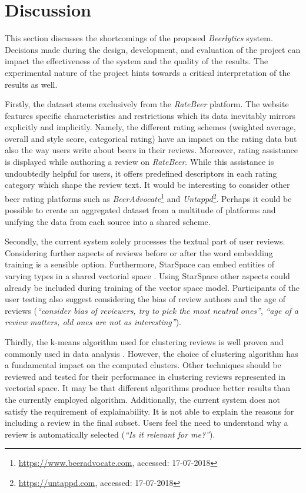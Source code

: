 \section{Discussion} \label{sec:discussion}
This section discusses the shortcomings of the proposed \textit{Beerlytics} system.
Decisions made during the design, development, and evaluation of the project can impact the effectiveness of the system and the quality of the results.
The experimental nature of the project hints towards a critical interpretation of the results as well.

Firstly, the dataset stems exclusively from the \textit{RateBeer} platform.
The website features specific characteristics and restrictions which its data inevitably mirrors explicitly and implicitly.
Namely, the different rating schemes (weighted average, overall and style score, categorical rating) have an impact on the rating data but also the way users write about beers in their reviews.
Moreover, rating assistance is displayed while authoring a review on \textit{RateBeer}.
While this assistance is undoubtedly helpful for users, it offers predefined descriptors in each rating category which shape the review text.
It would be interesting to consider other beer rating platforms such as \textit{BeerAdvocate}\footnote{\url{https://www.beeradvocate.com}, accessed: 17-07-2018} and \textit{Untappd}\footnote{\url{https://untappd.com}, accessed: 17-07-2018}.
Perhaps it could be possible to create an aggregated dataset from a multitude of platforms and unifying the data from each source into a shared scheme.

Secondly, the current system solely processes the textual part of user reviews.
Considering further aspects of reviews before or after the word embedding training is a sensible option.
Furthermore, StarSpace can embed entities of varying types in a shared vectorial space \cite{Wu2017}.
Using StarSpace other aspects could already be included during training of the vector space model.
Participants of the user testing also suggest considering the bias of review authors and the age of reviews (\emph{``consider bias of reviewers, try to pick the most neutral ones''}, \emph{``age of a review matters, old ones are not as interesting''}).

Thirdly, the k-means algorithm used for clustering reviews is well proven and commonly used in data analysis \cite{Manning2009}.
However, the choice of clustering algorithm has a fundamental impact on the computed clusters.
Other techniques should be reviewed and tested for their performance in clustering reviews represented in vectorial space.
It may be that different algorithms produce better results than the currently employed algorithm.
Additionally, the current system does not satisfy the requirement of explainability.
It is not able to explain the reasons for including a review in the final subset.
Users feel the need to understand why a review is automatically selected (\emph{``Is it relevant for me?''}).

